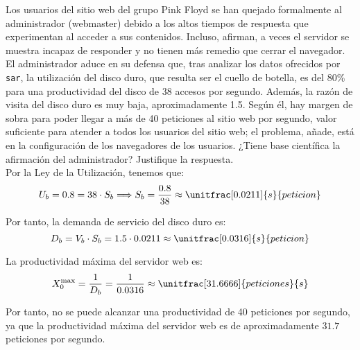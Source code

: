 \begin{ejercicio}\label{ej:5.21}
    Los usuarios del sitio web del grupo Pink Floyd se han quejado formalmente al administrador (webmaster) debido a los altos tiempos de respuesta que experimentan al acceder a sus contenidos. Incluso, afirman, a veces el servidor se muestra incapaz de responder y no tienen más remedio que cerrar el navegador. El administrador aduce en su defensa que, tras analizar los datos ofrecidos por \verb|sar|, la utilización del disco duro, que resulta ser el cuello de botella, es del 80\% para una productividad del disco de 38 accesos por segundo. Además, la razón de visita del disco duro es muy baja, aproximadamente 1.5. Según él, hay margen de sobra para poder llegar a más de 40 peticiones al sitio web por segundo, valor suficiente para atender a todos los usuarios del sitio web; el problema, añade, está en la configuración de los navegadores de los usuarios. ¿Tiene base científica la afirmación del administrador? Justifique la respuesta.\\

    Por la Ley de la Utilización, tenemos que:
    \begin{equation*}
        U_b = 0.8 = 38 \cdot S_b
        \Longrightarrow S_b = \dfrac{0.8}{38} \approx \unitfrac[0.0211]{s}{peticion}
    \end{equation*}

    Por tanto, la demanda de servicio del disco duro es:
    \begin{equation*}
        D_b = V_b \cdot S_b = 1.5 \cdot 0.0211 \approx \unitfrac[0.0316]{s}{peticion}
    \end{equation*}

    La productividad máxima del servidor web es:
    \begin{equation*}
        X_0^{\text{max}} = \dfrac{1}{D_b} = \dfrac{1}{0.0316} \approx \unitfrac[31.6666]{peticiones}{s}
    \end{equation*}

    Por tanto, no se puede alcanzar una productividad de 40 peticiones por segundo, ya que la productividad máxima del servidor web es de aproximadamente $31.7$ peticiones por segundo.
\end{ejercicio}
\begin{comment}
\solucion
    El administrador no tiene razón porque la productividad máxima que soporta el sitio web es de 31.7 peticiones por segundo.
\end{comment}

